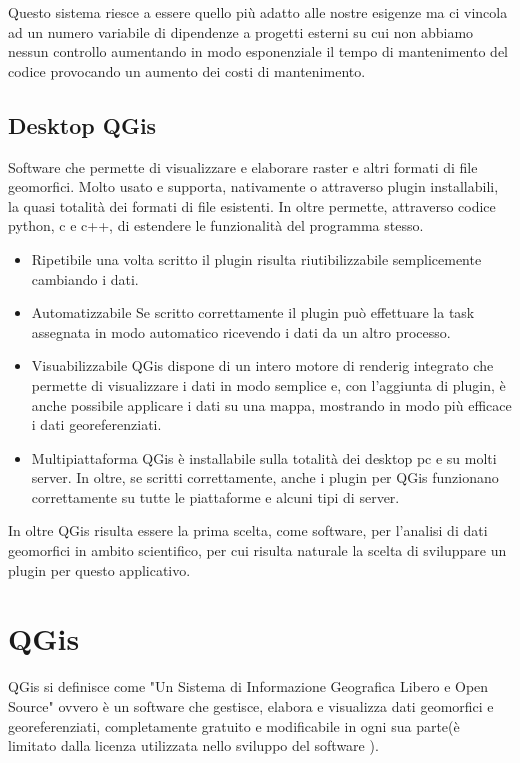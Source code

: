 Questo sistema riesce a essere quello più adatto alle nostre esigenze ma ci vincola ad un numero variabile di dipendenze a progetti esterni su cui non abbiamo nessun controllo aumentando in modo esponenziale il tempo di mantenimento del codice provocando un aumento dei costi di mantenimento.

\subsection{Desktop QGis}

Software che permette di visualizzare e elaborare raster e altri formati di file geomorfici. Molto usato e supporta, nativamente o attraverso plugin installabili, la quasi totalità dei formati di file esistenti. In oltre permette, attraverso codice python, c e c++, di estendere le funzionalità del programma stesso.

\begin{itemize}
	\item{Ripetibile} una volta scritto il plugin risulta riutibilizzabile semplicemente cambiando i dati.

	\item{Automatizzabile} Se scritto correttamente il plugin può effettuare la task assegnata in modo automatico ricevendo i dati da un altro processo.

	\item{Visuabilizzabile} QGis dispone di un intero motore di renderig integrato che permette di visualizzare i dati in modo semplice e, con l'aggiunta di plugin, è anche possibile applicare i dati su una mappa, mostrando in modo più efficace i dati georeferenziati.

	\item{Multipiattaforma} QGis è installabile sulla totalità dei desktop pc e su molti server. In oltre, se scritti correttamente, anche i plugin per QGis funzionano correttamente su tutte le piattaforme e alcuni tipi di server.
\end{itemize}

In oltre QGis risulta essere la prima scelta, come software, per l'analisi di dati geomorfici in ambito scientifico, per cui risulta naturale la scelta di sviluppare un plugin per questo applicativo.

\section{QGis}

QGis si definisce come "Un Sistema di Informazione Geografica Libero e Open Source"\cite{site:qgis} ovvero è un software che gestisce, elabora e visualizza dati geomorfici e georeferenziati, completamente gratuito e modificabile in ogni sua parte(è limitato dalla licenza utilizzata nello sviluppo del software \cite{site:cc3}).

